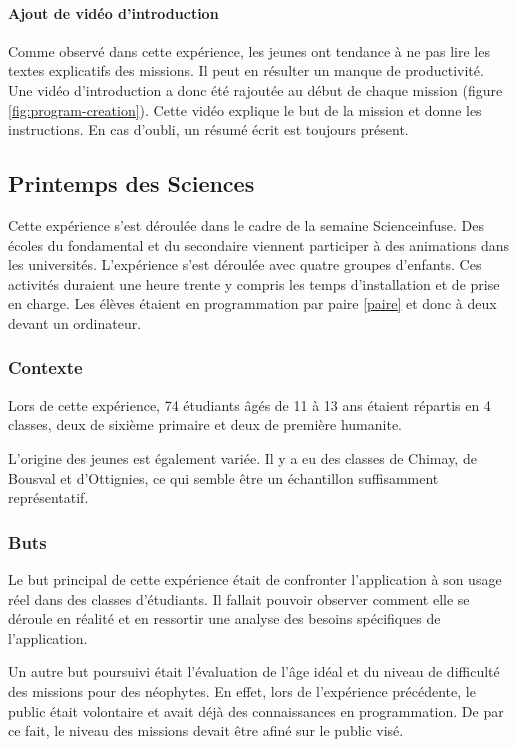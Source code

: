 \paragraph{Ajout de vidéo d'introduction}
Comme observé dans cette expérience, les jeunes ont tendance à ne pas lire les textes explicatifs des \glspl{mission}. Il peut en résulter un manque de productivité. Une vidéo d'introduction a donc été rajoutée au début de chaque \gls{mission} (figure \ref{fig:program-creation}). Cette vidéo explique le but de la \gls{mission} et donne les instructions. En cas d'oubli, un résumé écrit est toujours présent.

\subsection{Printemps des Sciences}
Cette expérience s'est déroulée dans le cadre de la semaine Scienceinfuse. Des écoles du \gls{fondamental} et du \gls{secondaire} viennent participer à des animations dans les universités. L'expérience s'est déroulée avec quatre groupes d'enfants. Ces activités duraient une heure trente y compris les temps d'installation et de prise en charge. Les élèves étaient en programmation par paire \ref{paire} et donc à deux devant un ordinateur.

\subsubsection{Contexte}
Lors de cette expérience, 74 étudiants âgés de 11 à 13 ans étaient répartis en 4 classes, deux de sixième \gls{primaire} et deux de première \gls{humanite}.

L'origine des jeunes est également variée. Il y a eu des classes de Chimay, de Bousval et d'Ottignies, ce qui semble être un échantillon suffisamment représentatif.

\subsubsection{Buts}
Le but principal de cette expérience était de confronter l'application à son usage réel dans des classes d'étudiants. Il fallait pouvoir observer comment elle se déroule en réalité et en ressortir une analyse des besoins spécifiques de l'application.

Un autre but poursuivi était l'évaluation de l'âge idéal et du niveau de difficulté des \glspl{mission} pour des néophytes. En effet, lors de l'expérience précédente, le public était volontaire et avait déjà des connaissances en programmation. De par ce fait, le niveau des \glspl{mission} devait être afiné sur le public visé.

